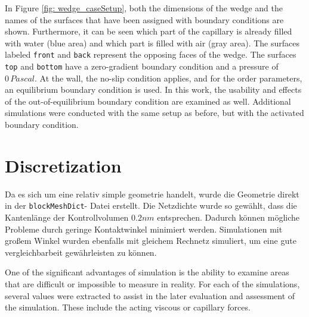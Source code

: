 In Figure \ref{fig: wedge_caseSetup}, both the dimensions of the wedge and the names of the surfaces that have been assigned with boundary conditions are shown. Furthermore, it can be seen which part of the capillary is already filled with water (blue area) and which part is filled with air (gray area). The surfaces labeled \texttt{front} and \texttt{back} represent the opposing faces of the wedge. The surfaces \texttt{top} and \texttt{bottom} have a zero-gradient boundary condition and a pressure of \(0\,Pascal\). At the wall, the no-slip condition applies, and for the order parameters, an equilibrium boundary condition is used. In this work, the usability and effects of the out-of-equilibrium boundary condition are examined as well. Additional simulations were conducted with the same setup as before, but with the activated boundary condition. 
\section{Discretization}
Da es sich um eine relativ simple geometrie handelt, wurde die Geometrie direkt in der \texttt{blockMeshDict}- Datei erstellt. Die Netzdichte wurde so gewählt, dass die Kantenlänge der Kontrollvolumen $0.2nm$ entsprechen. Dadurch können mögliche Probleme durch geringe Kontaktwinkel minimiert werden. Simulationen mit großem Winkel wurden ebenfalls mit gleichem Rechnetz simuliert, um eine gute vergleichbarbeit gewährleisten zu können. 




One of the significant advantages of simulation is the ability to examine areas that are difficult or impossible to measure in reality. For each of the simulations, several values were extracted to assist in the later evaluation and assessment of the simulation. These include the acting viscous or capillary forces.



